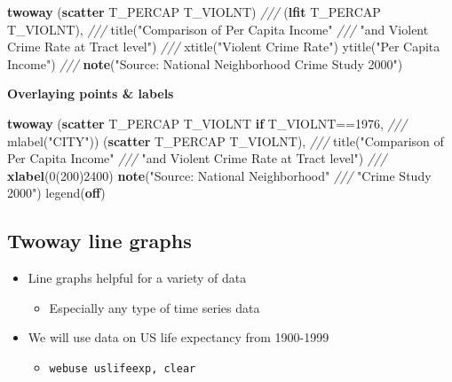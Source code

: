 \documentclass[
]{book}
\newenvironment{Shaded}{\begin{snugshade}}{\end{snugshade}}
\newcommand{\BaseNTok}[1]{\textcolor[rgb]{0.00,0.00,0.81}{#1}}
\newcommand{\CommentTok}[1]{\textcolor[rgb]{0.56,0.35,0.01}{\textit{#1}}}
\newcommand{\KeywordTok}[1]{\textcolor[rgb]{0.13,0.29,0.53}{\textbf{#1}}}
\newcommand{\NormalTok}[1]{#1}
\newcommand{\StringTok}[1]{\textcolor[rgb]{0.31,0.60,0.02}{#1}}
\providecommand{\tightlist}{%
  \setlength{\itemsep}{0pt}\setlength{\parskip}{0pt}}
\begin{document}
\begin{Shaded}
\begin{Highlighting}[]
\KeywordTok{twoway}\NormalTok{ (}\KeywordTok{scatter}\NormalTok{ T\_PERCAP T\_VIOLNT) }\CommentTok{///}
\NormalTok{    (}\KeywordTok{lfit}\NormalTok{ T\_PERCAP T\_VIOLNT), }\CommentTok{///}
    \BaseNTok{title}\NormalTok{(}\StringTok{"Comparison of Per Capita Income"} \CommentTok{///}
          \StringTok{"and Violent Crime Rate at Tract level"}\NormalTok{) }\CommentTok{///}
    \BaseNTok{xtitle}\NormalTok{(}\StringTok{"Violent Crime Rate"}\NormalTok{) }\BaseNTok{ytitle}\NormalTok{(}\StringTok{"Per Capita Income"}\NormalTok{) }\CommentTok{///}
    \KeywordTok{note}\NormalTok{(}\StringTok{"Source: National  Neighborhood Crime Study 2000"}\NormalTok{)}
\end{Highlighting}
\end{Shaded}

\textbf{Overlaying points \& labels}

\begin{Shaded}
\begin{Highlighting}[]
\KeywordTok{twoway}\NormalTok{ (}\KeywordTok{scatter}\NormalTok{ T\_PERCAP T\_VIOLNT }\KeywordTok{if}\NormalTok{ T\_VIOLNT==1976, }\CommentTok{///}
    \BaseNTok{mlabel}\NormalTok{(}\StringTok{"CITY"}\NormalTok{)) (}\KeywordTok{scatter}\NormalTok{ T\_PERCAP T\_VIOLNT), }\CommentTok{///}
    \BaseNTok{title}\NormalTok{(}\StringTok{"Comparison of Per Capita Income"} \CommentTok{///}
          \StringTok{"and Violent Crime Rate at Tract level"}\NormalTok{) }\CommentTok{///}
    \KeywordTok{xlabel}\NormalTok{(0(200)2400) }\KeywordTok{note}\NormalTok{(}\StringTok{"Source: National Neighborhood"} \CommentTok{///}
                            \StringTok{"Crime Study 2000"}\NormalTok{) }\BaseNTok{legend}\NormalTok{(}\KeywordTok{off}\NormalTok{)}
\end{Highlighting}
\end{Shaded}

\hypertarget{twoway-line-graphs}{%
\subsection{Twoway line graphs}\label{twoway-line-graphs}}

\begin{itemize}
\tightlist
\item
  Line graphs helpful for a variety of data

  \begin{itemize}
  \tightlist
  \item
    Especially any type of time series data
  \end{itemize}
\item
  We will use data on US life expectancy from 1900-1999

  \begin{itemize}
  \tightlist
  \item
    \texttt{webuse\ uslifeexp,\ clear}
  \end{itemize}
\end{itemize}
\end{document}
